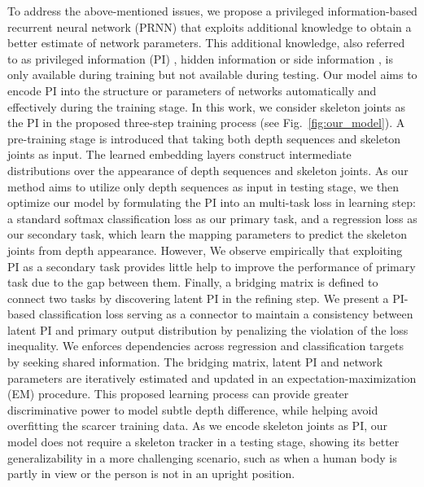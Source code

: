\documentclass[10pt,twocolumn,letterpaper]{article}
\begin{document}
To address the above-mentioned issues, we propose a privileged information-based recurrent neural network (PRNN) that exploits additional knowledge to obtain a better estimate of network parameters. This additional knowledge, also referred to as privileged information (PI) \cite{Vapnik2009544}, hidden information \cite{Wang_2015_CVPR} or side information \cite{Xu_nips_2013, Hoffman_cvpr_2016}, is only available during training but not available during testing. Our model aims to encode PI into the structure or parameters of networks automatically and effectively during the training stage. In this work, we consider skeleton joints as the PI in the proposed three-step training process (see Fig.~\ref{fig:our_model}). A pre-training stage is introduced that taking both depth sequences and skeleton joints as input. The learned embedding layers construct intermediate distributions over the appearance of depth sequences and skeleton joints. As our method aims to utilize only depth sequences as input in testing stage, we then optimize our model by formulating the PI into an multi-task loss in learning step: a standard softmax classification loss as our primary task, and a regression loss as our secondary task, which learn the mapping parameters to predict the skeleton joints from depth appearance. However, We observe empirically that exploiting PI as a secondary task provides little help to improve the performance of primary task due to the gap between them. Finally, a bridging matrix is defined to connect two tasks by discovering latent PI in the refining step. We present a PI-based classification loss serving as a connector to maintain a consistency between latent PI and primary output distribution by penalizing the violation of the loss inequality. We enforces dependencies across regression and classification targets by seeking shared information. The bridging matrix, latent PI and network parameters are iteratively estimated and updated in an expectation-maximization (EM) procedure.
This proposed learning process can provide greater discriminative power to model subtle depth difference, while helping avoid overfitting the scarcer training data. As we encode skeleton joints as PI, our model does not require a skeleton tracker in a testing stage, showing its better generalizability in a more challenging scenario, such as when a human body is partly in view or the person is not in an upright position. 
\end{document}
